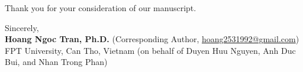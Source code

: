 \documentclass[10.5pt,a4paper]{article}
\begin{document}
\vspace{0.6em}\noindent
Thank you for your consideration of our manuscript.

\vspace{1em}\noindent
Sincerely,\\[0.4em]
\textbf{Hoang Ngoc Tran, Ph.D.} (Corresponding Author, \href{mailto:hoang2531992@gmail.com}{hoang2531992@gmail.com})\\
FPT University, Can Tho, Vietnam (on behalf of Duyen Huu Nguyen, Anh Duc Bui, and Nhan Trong Phan)
\end{document}
